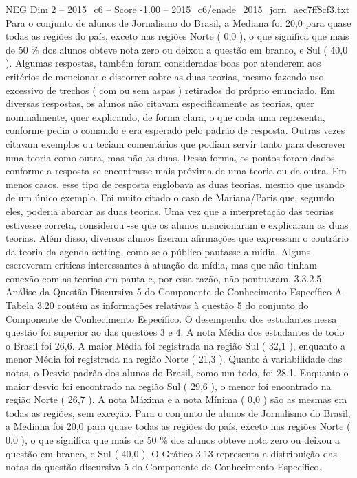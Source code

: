 \begin{textsample}{NEG Dim 2 – 2015\_c6 – Score -1.00 – 2015\_c6/enade\_2015\_jorn\_aec7ff8cf3.txt}
Para o conjunto de alunos de Jornalismo do Brasil, a Mediana foi 20,0 para quase todas as regiões do país, exceto nas regiões Norte ( 0,0 ), o que significa que mais de 50 \% dos alunos obteve nota zero ou deixou a questão em branco, e Sul ( 40,0 ).
Algumas respostas, também foram consideradas boas por atenderem aos critérios de mencionar e discorrer sobre as duas teorias, mesmo fazendo uso excessivo de trechos ( com ou sem aspas ) retirados do próprio enunciado.
Em diversas respostas, os alunos não citavam especificamente as teorias, quer nominalmente, quer explicando, de forma clara, o que cada uma representa, conforme pedia o comando e era esperado pelo padrão de resposta.
Outras vezes citavam exemplos ou teciam comentários que podiam servir tanto para descrever uma teoria como outra, mas não as duas.
Dessa forma, os pontos foram dados conforme a resposta se encontrasse mais próxima de uma teoria ou da outra.
Em menos casos, esse tipo de resposta englobava as duas teorias, mesmo que usando de um único exemplo.
Foi muito citado o caso de Mariana/Paris que, segundo eles, poderia abarcar as duas teorias.
Uma vez que a interpretação das teorias estivesse correta, considerou -se que os alunos mencionaram e explicaram as duas teorias.
Além disso, diversos alunos fizeram afirmações que expressam o contrário da teoria da agenda-setting, como se o público pautasse a mídia.
Alguns escreveram críticas interessantes à atuação da mídia, mas que não tinham conexão com as teorias em pauta e, por essa razão, não pontuaram. 3.3.2.5 Análise da Questão Discursiva 5 do Componente de Conhecimento Específico A Tabela 3.20 contém as informações relativas à questão 5 do conjunto do Componente de Conhecimento Específico.
O desempenho dos estudantes nessa questão foi superior ao das questões 3 e 4.
A nota Média dos estudantes de todo o Brasil foi 26,6.
A maior Média foi registrada na região Sul ( 32,1 ), enquanto a menor Média foi registrada na região Norte ( 21,3 ).
Quanto à variabilidade das notas, o Desvio padrão dos alunos do Brasil, como um todo, foi 28,1.
Enquanto o maior desvio foi encontrado na região Sul ( 29,6 ), o menor foi encontrado na região Norte ( 26,7 ).
A nota Máxima e a nota Mínima ( 0,0 ) são as mesmas em todas as regiões, sem exceção.
Para o conjunto de alunos de Jornalismo do Brasil, a Mediana foi 20,0 para quase todas as regiões do país, exceto nas regiões Norte ( 0,0 ), o que significa que mais de 50 \% dos alunos obteve nota zero ou deixou a questão em branco, e Sul ( 40,0 ).
O Gráfico 3.13 representa a distribuição das notas da questão discursiva 5 do Componente de Conhecimento Específico.

\end{textsample}
